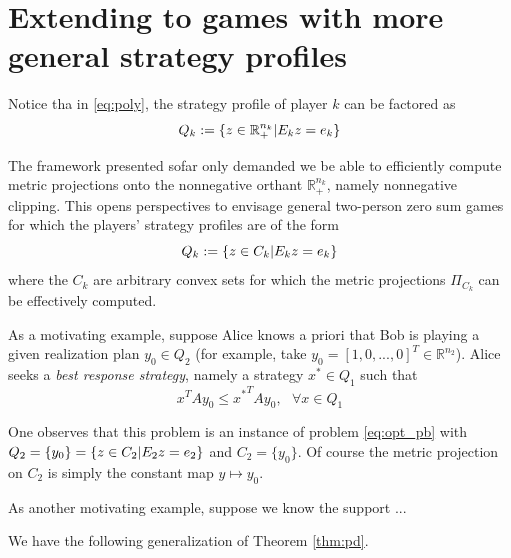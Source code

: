 \documentclass{article} %
\begin{document}
\section{Extending to games with more general strategy profiles}
\label{sec:algo_gen}
Notice tha in \eqref{eq:poly}, the strategy profile of player $k$ can be factored as
\begin{equation}
  Q_k := \{z \in \mathbb{R}^{n_k}_+| E_kz = e_k\text\}
\end{equation}

The framework presented sofar only demanded we be able to efficiently compute metric projections onto the nonnegative orthant $\mathbb{R}^{n_k}_+$, namely nonnegative clipping. This opens perspectives to envisage general two-person zero sum games for which the players' strategy profiles are of the form
\begin{equation}
  Q_k := \{z \in C_k| E_kz = e_k\text\}
  \label{eq:q_gen}
\end{equation}
where the $C_k$ are arbitrary convex sets for which the metric projections $\Pi_{C_k}$ can be effectively computed.

As a motivating example, suppose Alice knows a priori that Bob is playing a given realization plan $y_0 \in Q_2$ (for example, take $y_0 = [1, 0, ..., 0]^T \in \mathbb{R}^{n_2}$). Alice seeks a \textit{best response strategy}, namely a strategy $x^* \in Q_1$ such that
\begin{equation}
  x^TAy_0 \le {x^*}^TAy_0,\text{ } \forall x \in Q_1
\end{equation}

One observes that this problem is an instance of problem \eqref{eq:opt_pb} with
$Q_2 = \{y_0\} = \{z \in C_2| E_2z = e_2\text\}$ and $C_2 = \{y_0\}$. Of course the metric projection on $C_2$ is simply the constant map $y \mapsto y_0$.

As another motivating example, suppose we know the support ...

We have the following generalization of Theorem \ref{thm:pd}.
\end{document}
